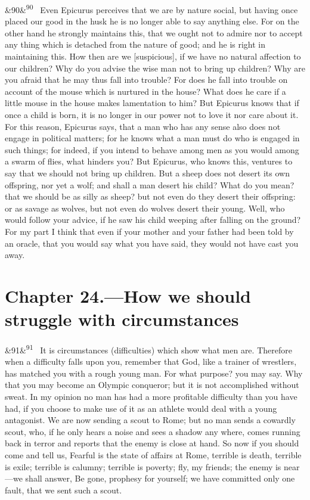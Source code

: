 \documentclass[12pt]{article}
\newcommand{\para}[1][]{\par\noindent\ifx&#1&\else\textsuperscript{\footnotesize #1}~\fi}
\begin{document}
\para[90] Even Epicurus perceives that we are by nature social, but having once placed our good in the husk he is no longer able to say anything else. For on the other hand he strongly maintains this, that we ought not to admire nor to accept any thing which is detached from the nature of good; and he is right in maintaining this. How then are we [suspicious], if we have no natural affection to our children? Why do you advise the wise man not to bring up children? Why are you afraid that he may thus fall into trouble? For does he fall into trouble on account of the mouse which is nurtured in the house? What does he care if a little mouse in the house makes lamentation to him? But Epicurus knows that if once a child is born, it is no longer in our power not to love it nor care about it. For this reason, Epicurus says, that a man who has any sense also does not engage in political matters; for he knows what a man must do who is engaged in such things; for indeed, if you intend to behave among men as you would among a swarm of flies, what hinders you? But Epicurus, who knows this, ventures to say that we should not bring up children. But a sheep does not desert its own offspring, nor yet a wolf; and shall a man desert his child? What do you mean? that we should be as silly as sheep? but not even do they desert their offspring: or as savage as wolves, but not even do wolves desert their young. Well, who would follow your advice, if he saw his child weeping after falling on the ground? For my part I think that even if your mother and your father had been told by an oracle, that you would say what you have said, they would not have cast you away.

\section*{Chapter 24.---How we should struggle with circumstances}

\para[91] It is circumstances (difficulties) which show what men are. Therefore when a difficulty falls upon you, remember that God, like a trainer of wrestlers, has matched you with a rough young man. For what purpose? you may say. Why that you may become an Olympic conqueror; but it is not accomplished without sweat. In my opinion no man has had a more profitable difficulty than you have had, if you choose to make use of it as an athlete would deal with a young antagonist. We are now sending a scout to Rome; but no man sends a cowardly scout, who, if he only hears a noise and sees a shadow any where, comes running back in terror and reports that the enemy is close at hand. So now if you should come and tell us, Fearful is the state of affairs at Rome, terrible is death, terrible is exile; terrible is calumny; terrible is poverty; fly, my friends; the enemy is near—we shall answer, Be gone, prophesy for yourself; we have committed only one fault, that we sent such a scout.
\end{document}
